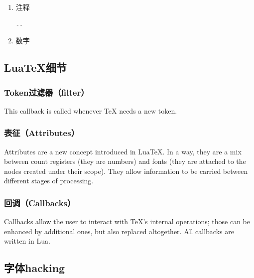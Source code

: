 \documentclass{article}
\begin{document}
\begin{enumerate}
\begin{table}[!ht]
\end{table}
\item 注释
\begin{center}
\verb!--!
\end{center}
\item 数字

\begin{table}[!ht]
\end{table}
\end{enumerate}
\subsection{Lua\TeX 细节}
\subsubsection{Token过滤器（filter）}
This callback is called whenever TeX needs a new token. 
\subsubsection{表征（Attributes）}
Attributes are a new concept introduced in LuaTeX. In a way, they are a mix between count registers (they are numbers) and fonts (they are attached to the nodes created under their scope). They allow information to be carried between different stages of processing. 
\subsubsection{回调（Callbacks）}
Callbacks allow the user to interact with TeX's internal operations; those can be enhanced by additional ones, but also replaced altogether. All callbacks are written in Lua. 
\subsection{字体hacking}
\end{document}
